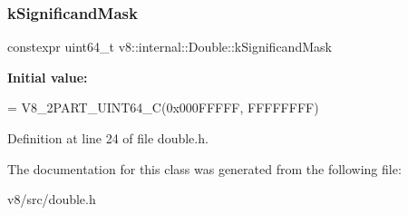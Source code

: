 \subsubsection{\texorpdfstring{k\+Significand\+Mask}{kSignificandMask}}
{\footnotesize\ttfamily constexpr uint64\+\_\+t v8\+::internal\+::\+Double\+::k\+Significand\+Mask\hspace{0.3cm}{\ttfamily [static]}}

{\bfseries Initial value\+:}
\begin{DoxyCode}
=
      V8\_2PART\_UINT64\_C(0x000FFFFF, FFFFFFFF)
\end{DoxyCode}


Definition at line 24 of file double.\+h.



The documentation for this class was generated from the following file\+:\begin{DoxyCompactItemize}
\item 
v8/src/double.\+h\end{DoxyCompactItemize}
